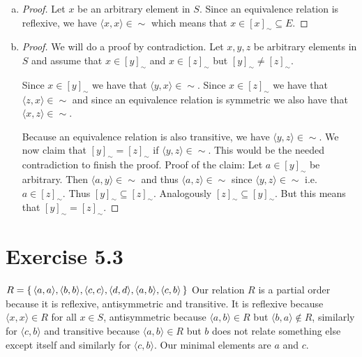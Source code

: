 \documentclass{article} %
\newcommand{\homeworkNumber}{5}
\begin{document}
\begin{enumerate}[a)]

\item \begin{proof}

Let $x$ be an arbitrary element in $S$. Since an equivalence relation is reflexive, we have $\langle x,x \rangle \in \sim$ which means that $x \in [x]_\sim \subseteq E$.

\end{proof}

\item \begin{proof}

We will do a proof by contradiction. Let $x,y,z$ be arbitrary elements in $S$ and assume that $x \in [y]_\sim$ and $x \in [z]_\sim$ but $[y]_\sim \neq [z]_\sim$.

Since $x \in [y]_\sim$ we have that $\langle y,x \rangle \in \sim$.
Since $x \in [z]_\sim$ we have that $\langle z,x \rangle \in \sim$ and since an equivalence relation is symmetric we also have that $\langle x,z \rangle \in \sim$.

Because an equivalence relation is also transitive, we have $\langle y,z \rangle \in \sim$. \newline
We now claim that $[y]_\sim = [z]_\sim$ if $\langle y,z \rangle \in \sim$. This would be the needed contradiction to finish the proof. \newline
Proof of the claim: Let $a \in [y]_\sim$ be arbitrary. Then $\langle a, y \rangle \in \sim$ and thus $\langle a,z \rangle \in \sim$ since $\langle y,z \rangle \in \sim$ i.e. $a \in [z]_\sim$. Thus $[y]_\sim \subseteq [z]_\sim$. Analogously $[z]_\sim \subseteq [y]_\sim$. But this means that $[y]_\sim = [z]_\sim$.

\end{proof}
\end{enumerate}


\section*{Exercise \homeworkNumber.3}

$R = \set{\langle a,a \rangle, \langle b,b \rangle, \langle c,c \rangle, \langle d,d \rangle, \langle a,b \rangle, \langle c,b \rangle}$
\newline
\newline
\noindent
Our relation $R$ is a partial order because it is reflexive, antisymmetric and transitive. It is reflexive because $\langle x,x \rangle \in R$ for all $x \in S$, antisymmetric because $\langle a,b \rangle \in R$ but $\langle b,a \rangle
\notin R$, similarly for $\langle c,b \rangle$ and transitive because $\langle a,b \rangle \in R$ but $b$ does not relate something else except itself and similarly for $\langle c,b \rangle$.
\newline
\newline
\noindent
Our minimal elements are $a$ and $c$.
\newpage
\end{document}
